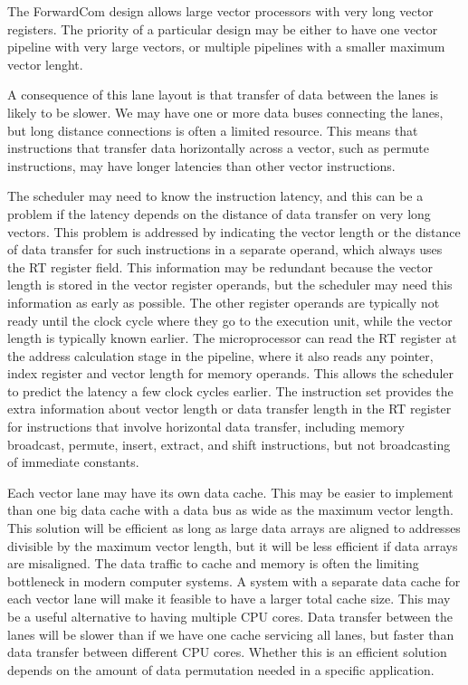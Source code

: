 \documentclass[forwardcom.tex]{subfiles}
\begin{document}
The ForwardCom design allows large vector processors with very long vector registers. The priority of a particular design may be either to have one vector pipeline with very large vectors, or multiple pipelines with a smaller maximum vector lenght.
\vv

A consequence of this lane layout is that transfer of data between the lanes is likely to be slower. We may have one or more data buses connecting the lanes, but long distance connections is often a limited resource.
This means that instructions that transfer data horizontally across a vector, such as permute instructions, may have longer latencies than other vector instructions. 
\vv

The scheduler may need to know the instruction latency, and this can be a problem if the latency depends on the distance of data transfer on very long vectors. This problem is addressed by indicating the vector length or the distance of data transfer for such instructions in a separate operand, which always uses the RT register field. This information may be redundant because the vector length is stored in the vector register operands, but the scheduler may need this information as early as possible. The other register operands are typically not ready until the clock cycle where they go to the execution unit, while the vector length is typically known earlier. The microprocessor can read the RT register at the address calculation stage in the pipeline, where it also reads any pointer, index register and vector length for memory operands. This allows the scheduler to predict the latency a few clock cycles earlier. The instruction set provides the extra information about vector length or data transfer length in the RT register for instructions that involve horizontal data transfer, including memory broadcast, permute, insert, extract, and shift instructions, but not broadcasting of immediate constants. 
\vv

Each vector lane may have its own data cache. This may be easier to implement than one big data cache with a data bus as wide as the maximum vector length. This solution will be efficient as long as large data arrays are aligned to addresses divisible by the maximum vector length, but it will be less efficient if data arrays are misaligned. 
The data traffic to cache and memory is often the limiting bottleneck in modern computer systems. A system with a separate data cache for each vector lane will make it feasible to have a larger total cache size. This may be a useful alternative to having multiple CPU cores. Data transfer between the lanes will be slower than if we have one cache servicing all lanes, but faster than data transfer between different CPU cores. Whether this is an efficient solution depends on the amount of data permutation needed in a specific application.
\vv
\end{document}
